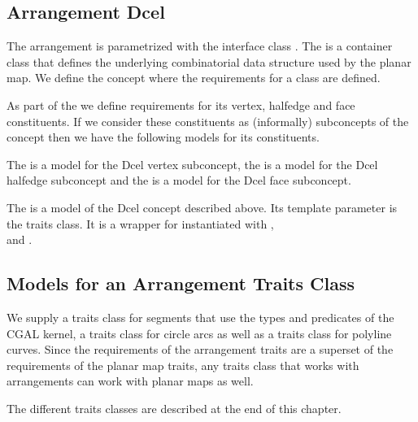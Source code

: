\subsection*{Arrangement Dcel}
The arrangement is parametrized with the interface class .
The  is a container class that defines the underlying
combinatorial data structure used by the planar map. We define the
concept  
where the requirements for a  class are defined.

As part of the  we define requirements for its vertex, halfedge and 
face constituents. If we consider these constituents as (informally) 
subconcepts of the  concept then we have the following models for
its constituents. 

The  is a model for the 
Dcel vertex subconcept,
the \mbox{} is a
model for the Dcel halfedge subconcept
and the \mbox{} is a
model for the Dcel face subconcept. 



The  is a model of the Dcel concept
described above. Its template parameter is the traits class.
It is a wrapper for  instantiated 
with \mbox{},\\
\mbox{} and 
\mbox{}.


\subsection*{Models for an Arrangement Traits Class} 
We supply a traits class for segments that use the types
and predicates of the CGAL kernel, a traits class for
circle arcs as well as a traits class for polyline curves.
Since the requirements of the arrangement traits
are a superset of the requirements of the planar map traits,
any traits class that works with arrangements can work with
planar maps as well.

The different traits classes are described at the end of this chapter.

